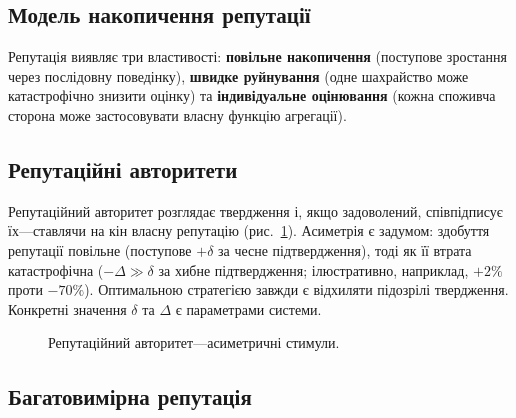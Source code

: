 \documentclass[11pt,a4paper,twocolumn]{article}
\begin{document}
\subsection{Модель накопичення репутації}

Репутація виявляє три властивості: \textbf{повільне накопичення} (поступове зростання через послідовну поведінку), \textbf{швидке руйнування} (одне шахрайство може катастрофічно знизити оцінку) та \textbf{індивідуальне оцінювання} (кожна споживча сторона може застосовувати власну функцію агрегації).

\subsection{Репутаційні авторитети}

Репутаційний авторитет розглядає твердження і, якщо задоволений, співпідписує їх---ставлячи на кін власну репутацію (рис.~\ref{fig:authority}). Асиметрія є задумом: здобуття репутації повільне (поступове $+\delta$ за чесне підтвердження), тоді як її втрата катастрофічна ($-\Delta \gg \delta$ за хибне підтвердження; ілюстративно, наприклад, $+2\%$ проти $-70\%$). Оптимальною стратегією завжди є відхиляти підозрілі твердження. Конкретні значення $\delta$ та $\Delta$ є параметрами системи.

\begin{figure}[ht]
\centering
{}
\caption{Репутаційний авторитет---асиметричні стимули.}
\label{fig:authority}
\end{figure}

\subsection{Багатовимірна репутація}
\end{document}
